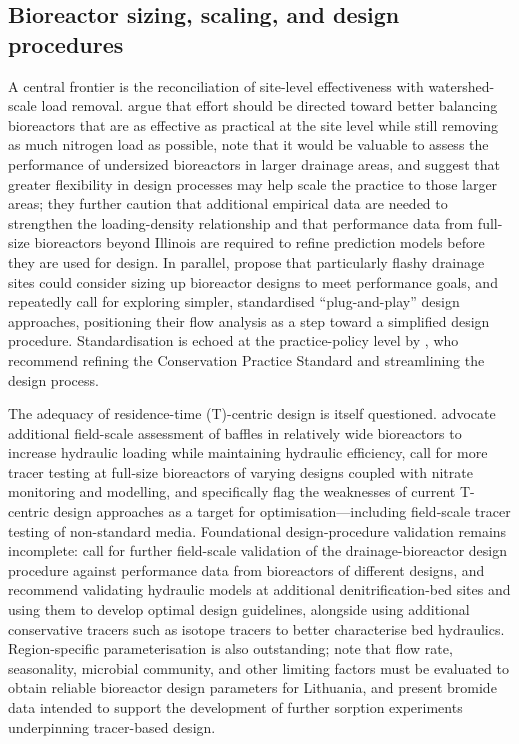 \documentclass[11pt]{article}
\begin{document}
\subsection{Bioreactor sizing, scaling, and design procedures}
A central frontier is the reconciliation of site-level effectiveness with watershed-scale load removal. \textcite{Christianson2026} argue that effort should be directed toward better balancing bioreactors that are as effective as practical at the site level while still removing as much nitrogen load as possible, note that it would be valuable to assess the performance of undersized bioreactors in larger drainage areas, and suggest that greater flexibility in design processes may help scale the practice to those larger areas; they further caution that additional empirical data are needed to strengthen the loading-density relationship and that performance data from full-size bioreactors beyond Illinois are required to refine prediction models before they are used for design. In parallel, \textcite{Dougherty2020b} propose that particularly flashy drainage sites could consider sizing up bioreactor designs to meet performance goals, and repeatedly call for exploring simpler, standardised ``plug-and-play'' design approaches, positioning their flow analysis as a step toward a simplified design procedure. Standardisation is echoed at the practice-policy level by \textcite{Christianson2021}, who recommend refining the Conservation Practice Standard and streamlining the design process.

The adequacy of residence-time (T)-centric design is itself questioned. \textcite{deOliveira2023} advocate additional field-scale assessment of baffles in relatively wide bioreactors to increase hydraulic loading while maintaining hydraulic efficiency, call for more tracer testing at full-size bioreactors of varying designs coupled with nitrate monitoring and modelling, and specifically flag the weaknesses of current T-centric design approaches as a target for optimisation---including field-scale tracer testing of non-standard media. Foundational design-procedure validation remains incomplete: \textcite{Christianson2013} call for further field-scale validation of the drainage-bioreactor design procedure against performance data from bioreactors of different designs, and \textcite{Ghane2015} recommend validating hydraulic models at additional denitrification-bed sites and using them to develop optimal design guidelines, alongside using additional conservative tracers such as isotope tracers to better characterise bed hydraulics. Region-specific parameterisation is also outstanding; \textcite{Povilaitis2020} note that flow rate, seasonality, microbial community, and other limiting factors must be evaluated to obtain reliable bioreactor design parameters for Lithuania, and \textcite{Ghane2019} present bromide data intended to support the development of further sorption experiments underpinning tracer-based design.
\end{document}

